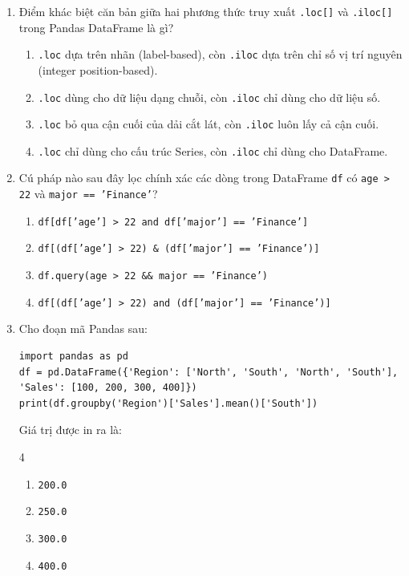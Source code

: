 \documentclass[11pt,a4paper]{article}
\begin{document}
\begin{enumerate}[leftmargin=*,itemsep=2.5pt,resume]
\item Điểm khác biệt căn bản giữa hai phương thức truy xuất \texttt{.loc[]} và \texttt{.iloc[]} trong Pandas DataFrame là gì?
\begin{enumerate}[label=\Alph*.]
  \item \texttt{.loc} dựa trên nhãn (label-based), còn \texttt{.iloc} dựa trên chỉ số vị trí nguyên (integer position-based).
  \item \texttt{.loc} dùng cho dữ liệu dạng chuỗi, còn \texttt{.iloc} chỉ dùng cho dữ liệu số.
  \item \texttt{.loc} bỏ qua cận cuối của dải cắt lát, còn \texttt{.iloc} luôn lấy cả cận cuối.
  \item \texttt{.loc} chỉ dùng cho cấu trúc Series, còn \texttt{.iloc} chỉ dùng cho DataFrame.
\end{enumerate}

\item Cú pháp nào sau đây lọc chính xác các dòng trong DataFrame \texttt{df} có \texttt{age > 22} và \texttt{major == 'Finance'}?
\begin{enumerate}[label=\Alph*.]
  \item \texttt{df[df['age'] > 22 and df['major'] == 'Finance']}
  \item \texttt{df[(df['age'] > 22) \& (df['major'] == 'Finance')]}
  \item \texttt{df.query(age > 22 \&\& major == 'Finance')}
  \item \texttt{df[(df['age'] > 22) and (df['major'] == 'Finance')]}
\end{enumerate}

\item Cho đoạn mã Pandas sau:
\begin{lstlisting}
import pandas as pd
df = pd.DataFrame({'Region': ['North', 'South', 'North', 'South'], 'Sales': [100, 200, 300, 400]})
print(df.groupby('Region')['Sales'].mean()['South'])
\end{lstlisting}
Giá trị được in ra là:
\begin{multicols}{4}
\begin{enumerate}[label=\Alph*.]
  \item \texttt{200.0}
  \item \texttt{250.0}
  \item \texttt{300.0}
  \item \texttt{400.0}
\end{enumerate}
\end{multicols}


\end{enumerate}
\end{document}
